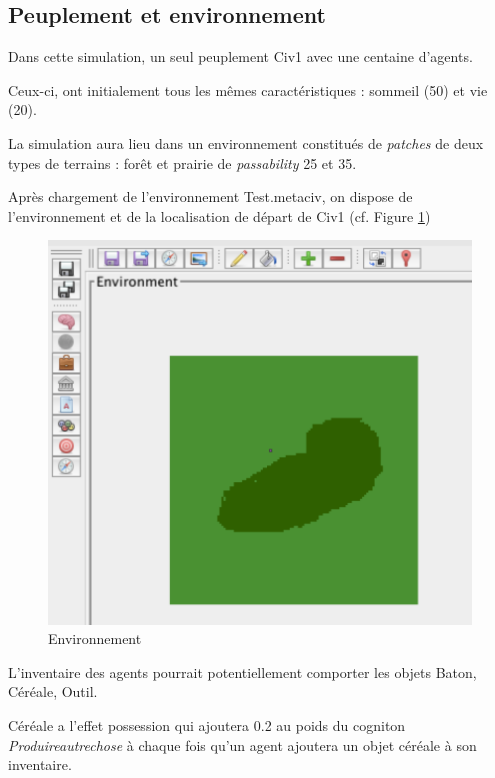 \subsection{Peuplement et environnement}
Dans cette simulation, un seul peuplement Civ1 avec une centaine d'agents.

Ceux-ci, ont initialement tous les mêmes caractéristiques : sommeil (50) et vie (20).

La simulation aura lieu dans un environnement constitués de \textit{patches} de deux types de  terrains : forêt et prairie de \textit{passability} 25 et 35.

Après chargement de l'environnement Test.metaciv, on dispose de l'environnement et de la localisation de départ de Civ1 (cf. Figure \ref{loca})
\begin{figure}[!ht]
\begin{center}
\includegraphics[scale=0.5]{DocumentationSimulation/locas1.pdf}
\caption[loca]{Environnement \\}
\label{loca}
\end{center}
\end{figure} 

L'inventaire des agents pourrait potentiellement comporter les objets Baton, Céréale, Outil.

Céréale a l'effet possession qui ajoutera 0.2 au poids du cogniton \textit{Produireautrechose  }à chaque fois qu'un agent ajoutera un objet céréale à son inventaire.

